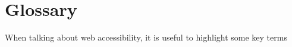 \documentclass[ %
                    author={Aleena Baig},
                supervisor={Dr Simon Lock},
                    degree={BSc},
                     title={On Making Web Accessible Graphs},
                  subtitle={},
                      year={2019} ]{dissertation}
\begin{document}

\chapter{Glossary}


When talking about web accessibility, it is useful to highlight some key terms

\BlankLine
%
\glsaddall
\printglossary[nonumberlist]

\printbibliography
\end{document}
